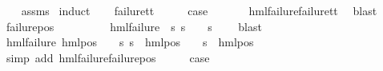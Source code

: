 \begin{isabellebody}
%
\isadelimproof
\ \ %
\endisadelimproof
%
\isatagproof
{}\isamarkupfalse%
\ assms\ \isamarkupfalse%
{\isacharparenleft}{\kern0pt}induct{\isacharparenright}{\kern0pt}\isanewline
\ \ \isamarkupfalse%
\ failure{\isacharunderscore}{\kern0pt}tt\isanewline
\ \ \isamarkupfalse%
\ \isamarkupfalse%
\ {\isacharquery}{\kern0pt}case\ \isanewline
\ \ \ \ \isamarkupfalse%
\ hml{\isacharunderscore}{\kern0pt}failure{\isachardot}{\kern0pt}failure{\isacharunderscore}{\kern0pt}tt\ \isamarkupfalse%
\ blast\isanewline
{}\isamarkupfalse%
\isanewline
\ \ \isamarkupfalse%
\ {\isacharparenleft}{\kern0pt}failure{\isacharunderscore}{\kern0pt}pos\ {\isasymphi}\ {\isasymalpha}{\isacharparenright}{\kern0pt}\isanewline
\ \ \isamarkupfalse%
\ \isamarkupfalse%
\ {\isasympsi}\ \ {\isachardoublequoteopen}hml{\isacharunderscore}{\kern0pt}failure\ {\isasympsi}{\isachardoublequoteclose}\ {\isachardoublequoteopen}{\isacharparenleft}{\kern0pt}{\isasymforall}s{\isachardot}{\kern0pt}\ {\isacharparenleft}{\kern0pt}s\ {\isasymTurnstile}\ {\isasymphi}{\isacharparenright}{\kern0pt}\ {\isacharequal}{\kern0pt}\ {\isacharparenleft}{\kern0pt}s\ {\isasymTurnstile}\ {\isasympsi}{\isacharparenright}{\kern0pt}{\isacharparenright}{\kern0pt}{\isachardoublequoteclose}\ \isamarkupfalse%
\ blast\isanewline
\ \ \isamarkupfalse%
\ {\isachardoublequoteopen}hml{\isacharunderscore}{\kern0pt}failure\ {\isacharparenleft}{\kern0pt}hml{\isacharunderscore}{\kern0pt}pos\ {\isasymalpha}\ {\isasympsi}{\isacharparenright}{\kern0pt}\ {\isasymand}\ {\isacharparenleft}{\kern0pt}{\isasymforall}s{\isachardot}{\kern0pt}\ {\isacharparenleft}{\kern0pt}s\ {\isasymTurnstile}\ hml{\isacharunderscore}{\kern0pt}pos\ {\isasymalpha}\ {\isasymphi}{\isacharparenright}{\kern0pt}\ {\isacharequal}{\kern0pt}\ {\isacharparenleft}{\kern0pt}s\ {\isasymTurnstile}\ {\isacharparenleft}{\kern0pt}hml{\isacharunderscore}{\kern0pt}pos\ {\isasymalpha}\ {\isasympsi}{\isacharparenright}{\kern0pt}{\isacharparenright}{\kern0pt}{\isacharparenright}{\kern0pt}{\isachardoublequoteclose}\ \isanewline
\ \ \ \ \isamarkupfalse%
\ {\isacharparenleft}{\kern0pt}simp\ add{\isacharcolon}{\kern0pt}\ hml{\isacharunderscore}{\kern0pt}failure{\isachardot}{\kern0pt}failure{\isacharunderscore}{\kern0pt}pos{\isacharparenright}{\kern0pt}\isanewline
\ \ \isamarkupfalse%
\ \isamarkupfalse%
\ {\isacharquery}{\kern0pt}case\ \isamarkupfalse%

\end{isabellebody}
